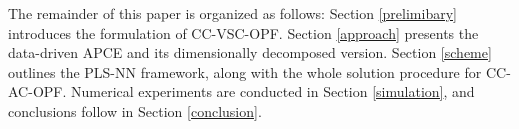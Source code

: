 \documentclass[journal]{IEEEtran}
\theoremstyle{definition}
\theoremstyle{remark}
\begin{document}
The remainder of this paper is organized as follows: Section \ref{prelimibary} introduces the formulation of CC-VSC-OPF. Section \ref{approach} presents the data-driven APCE and its dimensionally decomposed version. Section \ref{scheme} outlines the PLS-NN framework, along with the whole solution procedure for CC-AC-OPF. Numerical experiments are conducted in Section \ref{simulation}, and conclusions follow in Section \ref{conclusion}.

%
%



%
%
\end{document}

